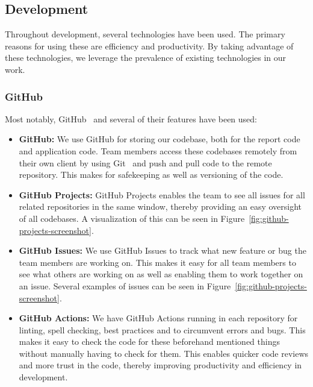 \subsection{Development}\label{subsec:development}

Throughout development, several technologies have been used.
The primary reasons for using these are efficiency and productivity.
By taking advantage of these technologies, we leverage the prevalence of existing technologies in our work.

\subsubsection{GitHub}

Most notably, GitHub~\cite{github2024} and several of their features have been used:

\begin{itemize}
    \item \textbf{GitHub:}
    We use GitHub for storing our codebase, both for the report code and application code.
    Team members access these codebases remotely from their own client by using Git~\cite{git2024} and push and pull
    code to the remote repository.
    This makes for safekeeping as well as versioning of the code.

    \item \textbf{GitHub Projects:}
    GitHub Projects enables the team to see all issues for all related repositories in the same window, thereby
    providing an easy oversight of all codebases.
    A visualization of this can be seen in Figure~\ref{fig:github-projects-screenshot}.

    \item \textbf{GitHub Issues:}
    We use GitHub Issues to track what new feature or bug the team members are working on.
    This makes it easy for all team members to see what others are working on as well as enabling them to work together
    on an issue.
    Several examples of issues can be seen in Figure~\ref{fig:github-projects-screenshot}.

    \item \textbf{GitHub Actions:}
    We have GitHub Actions running in each repository for linting, spell checking, best practices and to
    circumvent errors and bugs.
    This makes it easy to check the code for these beforehand mentioned things without manually having to check for
    them.
    This enables quicker code reviews and more trust in the code, thereby improving productivity and efficiency in
    development.
\end{itemize}

